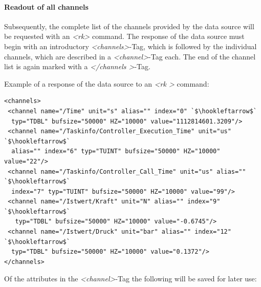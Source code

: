 \documentclass[a4paper,12pt,BCOR6mm,bibtotoc,idxtotoc]{scrbook}
\begin{document}
\paragraph{Readout of all channels} Subsequently, the complete list of the
channels provided by the data source will be requested with an
\textit{\textless rk\textgreater} command. The response of the data source
must begin with an introductory \textit{\textless channels\textgreater}-Tag,
which is followed by the individual channels, which are described in a
\textit{\textless channel\textgreater}-Tag each. The end of the channel list
is again marked with a \textit{\textless /channels \textgreater}-Tag.

Example of a response of the data source to an \textit{\textless rk
\textgreater} command:

\begin{lstlisting}[basicstyle=\ttfamily\scriptsize]
<channels>
 <channel name="/Time" unit="s" alias="" index="0" `$\hookleftarrow$`
  typ="TDBL" bufsize="50000" HZ="10000" value="1112814601.3209"/>
 <channel name="/Taskinfo/Controller_Execution_Time" unit="us" `$\hookleftarrow$`
  alias="" index="6" typ="TUINT" bufsize="50000" HZ="10000" value="22"/>
 <channel name="/Taskinfo/Controller_Call_Time" unit="us" alias="" `$\hookleftarrow$`
  index="7" typ="TUINT" bufsize="50000" HZ="10000" value="99"/>
 <channel name="/Istwert/Kraft" unit="N" alias="" index="9" `$\hookleftarrow$`
   typ="TDBL" bufsize="50000" HZ="10000" value="-0.6745"/>
 <channel name="/Istwert/Druck" unit="bar" alias="" index="12" `$\hookleftarrow$`
  typ="TDBL" bufsize="50000" HZ="10000" value="0.1372"/>
</channels>
\end{lstlisting}

Of the attributes in the \textit{\textless channel\textgreater}-Tag the
following will be saved for later use:
\end{document}
